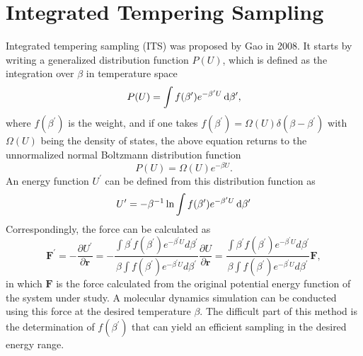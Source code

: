 \section{Integrated Tempering Sampling\label{Sec:ES:ITS}}
Integrated tempering sampling (ITS) was proposed by Gao in 2008.\cite{GaoJCP2008}  It starts by writing a generalized distribution function $P(U)$, which is defined as the integration over $\beta$ in temperature space
\begin{equation}
	P(U)=\int f(\beta^\prime) e^{-\beta^\prime U}\mathop{}\!\mathrm{d} \beta^\prime,
	\label{Eq:ES:ITS:distribution}
\end{equation}
where $f(\beta^\prime)$ is the weight, and if one takes $f(\beta^\prime)=\Omega(U)\delta(\beta - \beta^\prime)$ with $\Omega(U)$ being the density of states, the above equation returns to the unnormalized normal Boltzmann distribution function
\begin{equation}
	P(U)=\Omega(U)e^{-\beta U}.
\end{equation}
An energy function $U^\prime$ can be defined from this distribution function as
\begin{equation}
	U^\prime=-\beta^{-1}\ln \int f(\beta^\prime) e^{-\beta^\prime U}\mathop{}\!\mathrm{d} \beta^\prime
\end{equation}
Correspondingly, the force can be calculated as
\begin{equation}
	\mathbf{F}^\prime=-\frac{\partial U^\prime}{\partial \mathbf{r}}=-\frac{\int \beta^{\prime} f\left(\beta^{\prime}\right) e^{-\beta^{\prime} U} d \beta^{\prime}}{\beta \int f\left(\beta^{\prime}\right) e^{-\beta^{\prime} U} d \beta^{\prime}} \frac{\partial U}{\partial \mathbf{r}}=\frac{\int \beta^{\prime} f\left(\beta^{\prime}\right) e^{-\beta^{\prime} U} d \beta^{\prime}}{\beta \int f\left(\beta^{\prime}\right) e^{-\beta^{\prime} U} d \beta^{\prime}} \mathbf{F} ,
\end{equation}
in which $\mathbf{F}$ is the force calculated from the original potential energy function of the system under study. A molecular dynamics simulation can be conducted using this force at the desired temperature $\beta$. The difficult part of this method is the determination of $f(\beta^\prime)$ that can yield an efficient sampling in the desired energy range.


